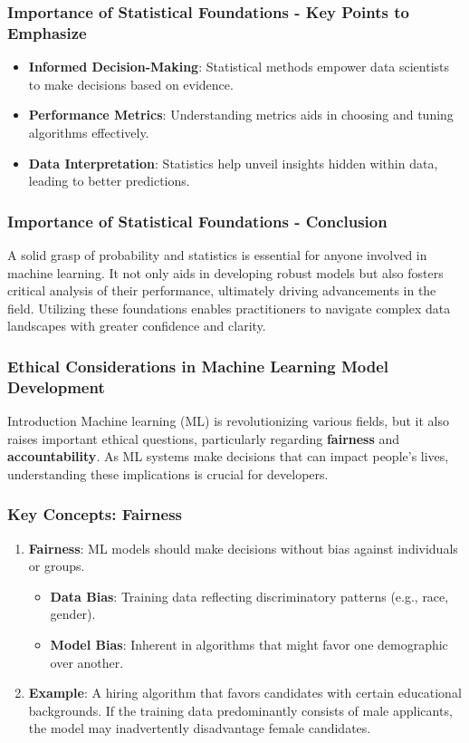 \documentclass{beamer}
\begin{document}
\begin{frame}[fragile]
    \frametitle{Importance of Statistical Foundations - Key Points to Emphasize}
    \begin{itemize}
        \item \textbf{Informed Decision-Making}: Statistical methods empower data scientists to make decisions based on evidence.
        \item \textbf{Performance Metrics}: Understanding metrics aids in choosing and tuning algorithms effectively.
        \item \textbf{Data Interpretation}: Statistics help unveil insights hidden within data, leading to better predictions.
    \end{itemize}
\end{frame}

\begin{frame}[fragile]
    \frametitle{Importance of Statistical Foundations - Conclusion}
    A solid grasp of probability and statistics is essential for anyone involved in machine learning. It not only aids in developing robust models but also fosters critical analysis of their performance, ultimately driving advancements in the field. Utilizing these foundations enables practitioners to navigate complex data landscapes with greater confidence and clarity.
\end{frame}

\begin{frame}[fragile]
    \frametitle{Ethical Considerations in Machine Learning Model Development}
    \begin{block}{Introduction}
        Machine learning (ML) is revolutionizing various fields, but it also raises important ethical questions, particularly regarding \textbf{fairness} and \textbf{accountability}. As ML systems make decisions that can impact people's lives, understanding these implications is crucial for developers.
    \end{block}
\end{frame}

\begin{frame}[fragile]
    \frametitle{Key Concepts: Fairness}
    \begin{enumerate}
        \item \textbf{Fairness}: ML models should make decisions without bias against individuals or groups. 
        \begin{itemize}
            \item \textbf{Data Bias}: Training data reflecting discriminatory patterns (e.g., race, gender).
            \item \textbf{Model Bias}: Inherent in algorithms that might favor one demographic over another.
        \end{itemize}

        \item \textbf{Example}: A hiring algorithm that favors candidates with certain educational backgrounds. If the training data predominantly consists of male applicants, the model may inadvertently disadvantage female candidates.
    \end{enumerate}
\end{frame}
\end{document}
